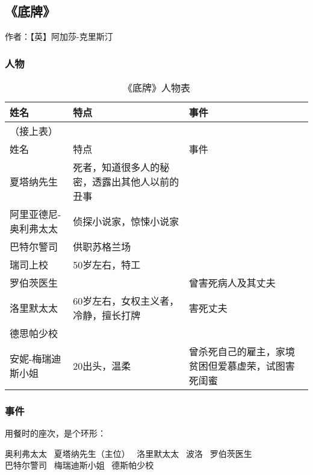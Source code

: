 \subsection{《底牌》}

作者：【英】阿加莎-克里斯汀

\subsubsection{人物}
\begin{longtable}{p{} | p{} | p{}}
    \caption{《底牌》人物表} \\
    \hline
姓名 & 特点 & 事件 \\
\hline
\endfirsthead

（接上表） \\
姓名 & 特点 & 事件 \\
\hline
\endhead

\hline
\endfoot
夏塔纳先生 & 死者，知道很多人的秘密，透露出其他人以前的丑事	& \\
阿里亚德尼-奥利弗太太 & 侦探小说家，惊悚小说家 & \\
巴特尔警司 & 供职苏格兰场 & \\	
瑞司上校 & 50岁左右，特工 & \\
罗伯茨医生 & & 曾害死病人及其丈夫 \\
洛里默太太 & 60岁左右，女权主义者，冷静，擅长打牌 & 害死丈夫 \\
德思帕少校 & & \\
安妮-梅瑞迪斯小姐 & 20出头，温柔 & 曾杀死自己的雇主，家境贫困但爱慕虚荣，试图害死闺蜜 \\
\end{longtable}


\subsubsection{事件}

用餐时的座次，是个环形：\\
\begin{centering}
奥利弗太太 \ 夏塔纳先生（主位） \ 洛里默太太 \	波洛 \	罗伯茨医生 \\
巴特尔警司 \ 梅瑞迪斯小姐 \ 德斯帕少校 \\
\end{centering}

